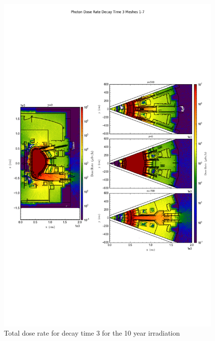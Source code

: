 \documentclass[12pt]{article}
\begin{document}
\clearpage
\begin{figure}[ht!]
\centering
\includegraphics[trim={0cm 8cm, 0cm 8cm},clip,scale=0.75]{../plots/final_model/10year/Photon_Dose_Rate_Decay_Time_3_Meshes_1-7.png}
\caption{Total dose rate for decay time 3 for the 10 year irradiation}
\label{fig:photons_10y_dc2_nob4c_dose}
\end{figure}
\end{document}
